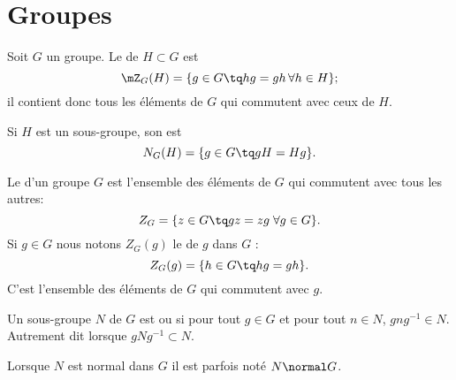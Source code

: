 
\section{Groupes}

\begin{definition}
    Soit \( G\) un groupe. Le  de \( H\subset G\) est
    \begin{equation}
        \mZ_G(H)=\{ g\in G\tq hg=gh\,\forall h\in H\};
    \end{equation}
    il contient donc tous les éléments de \( G\) qui commutent avec ceux de \( H\).

    Si \( H\) est un sous-groupe, son  est
    \begin{equation}
        N_G(H)=\{ g\in G\tq gH=Hg \}.
    \end{equation}
\end{definition}

\begin{definition}\label{defGroupeCentre}
Le  d'un groupe \( G\) est l'ensemble des éléments de \( G\) qui commutent avec tous les autres:
\begin{equation}
    Z_G=\{ z\in G\tq gz=zg\;\forall g\in G \}.
\end{equation}
Si \( g\in G\) nous notons \( Z_G(g)\) le  de \( g\) dans \( G\) :
\begin{equation}
    Z_G(g)=\{h\in G\tq hg=gh\}.
\end{equation}
C'est l'ensemble des éléments de \( G\) qui commutent avec \( g\).


\end{definition}

\begin{definition}\label{definitionGroupeNormal}
    Un sous-groupe \( N\) de \( G\) est  ou  si pour tout \( g\in G\) et pour tout \( n\in N\), \( gng^{-1}\in N\). Autrement dit lorsque \( gNg^{-1}\subset N\).

    Lorsque \( N\) est normal dans \( G\) il est parfois noté \( N\normal G\).
\end{definition}

